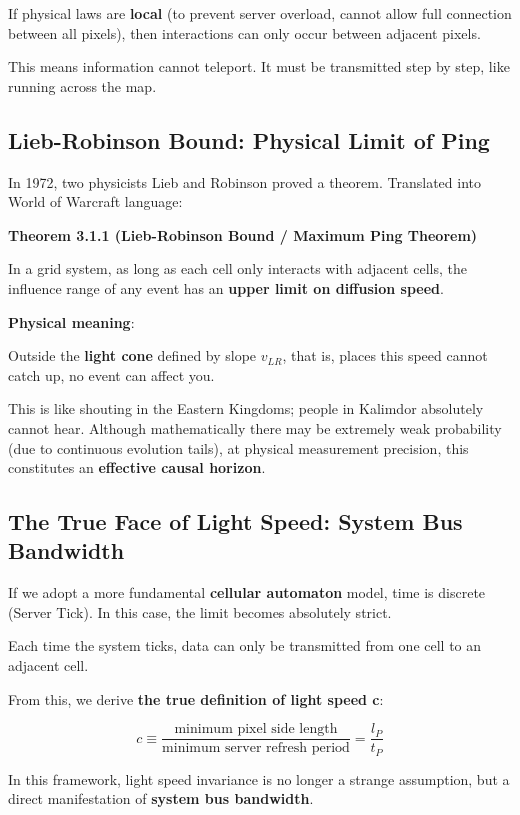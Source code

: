 If physical laws are \textbf{local} (to prevent server overload, cannot allow full connection between all pixels), then interactions can only occur between adjacent pixels.

This means information cannot teleport. It must be transmitted step by step, like running across the map.

\subsection{Lieb-Robinson Bound: Physical Limit of Ping}

In 1972, two physicists Lieb and Robinson proved a theorem. Translated into World of Warcraft language:

\textbf{Theorem 3.1.1 (Lieb-Robinson Bound / Maximum Ping Theorem)}

In a grid system, as long as each cell only interacts with adjacent cells, the influence range of any event has an \textbf{upper limit on diffusion speed}.

\textbf{Physical meaning}:

Outside the \textbf{light cone} defined by slope $v_{LR}$, that is, places this speed cannot catch up, no event can affect you.

This is like shouting in the Eastern Kingdoms; people in Kalimdor absolutely cannot hear. Although mathematically there may be extremely weak probability (due to continuous evolution tails), at physical measurement precision, this constitutes an \textbf{effective causal horizon}.

\subsection{The True Face of Light Speed: System Bus Bandwidth}

If we adopt a more fundamental \textbf{cellular automaton} model, time is discrete (Server Tick). In this case, the limit becomes absolutely strict.

Each time the system ticks, data can only be transmitted from one cell to an adjacent cell.

From this, we derive \textbf{the true definition of light speed c}:

\[
c \equiv \frac{\text{minimum pixel side length}}{\text{minimum server refresh period}} = \frac{l_P}{t_P}
\]

In this framework, light speed invariance is no longer a strange assumption, but a direct manifestation of \textbf{system bus bandwidth}.

